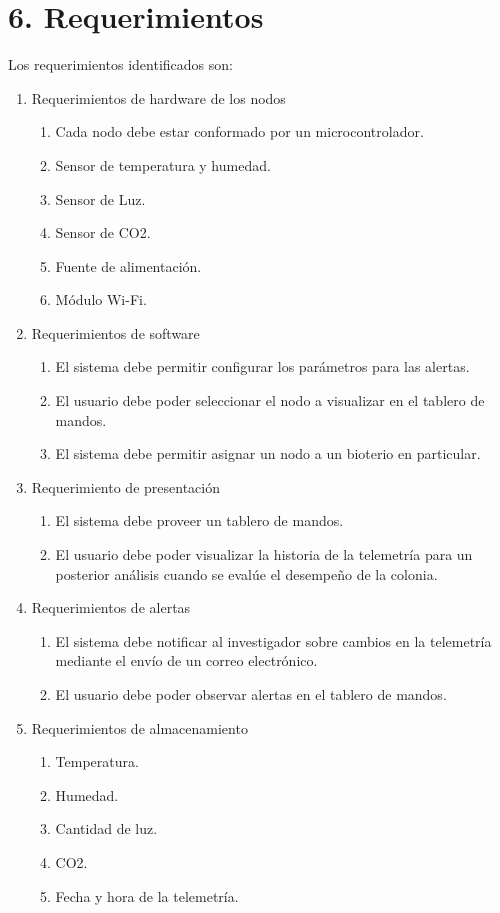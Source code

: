 \documentclass[
11pt, %
]{charter}
\begin{document}
\section{6. Requerimientos}
\label{sec:requerimientos}

Los requerimientos identificados son:
\begin{enumerate}
	\item Requerimientos de hardware de los nodos
		\begin{enumerate}
			\item Cada nodo debe estar conformado por un microcontrolador.
			\item Sensor de temperatura y humedad.
			\item Sensor de Luz.
			\item Sensor de CO2.
			\item Fuente de alimentación.
			\item Módulo Wi-Fi.
		\end{enumerate}
	\item Requerimientos de software
		\begin{enumerate}
			\item El sistema debe permitir configurar los parámetros para las alertas.
			\item El usuario debe poder seleccionar el nodo a visualizar en el tablero de mandos.
			\item El sistema debe permitir asignar un nodo a un bioterio en particular.
		\end{enumerate}
	\item Requerimiento de presentación
		\begin{enumerate}
			\item El sistema debe proveer un tablero de mandos.
			\item El usuario debe poder visualizar la historia de la telemetría para un posterior análisis cuando se evalúe el desempeño de la colonia.
		\end{enumerate}
	\item Requerimientos de alertas
		\begin{enumerate}
			\item El sistema debe notificar al investigador sobre cambios en la telemetría mediante el envío de un correo electrónico.
			\item El usuario debe poder observar alertas en el tablero de mandos.
		\end{enumerate}
	\item Requerimientos de almacenamiento
		\begin{enumerate}
			\item Temperatura.
			\item Humedad.
			\item Cantidad de luz.
			\item CO2.
			\item Fecha y hora de la telemetría.
		\end{enumerate}
\end{enumerate}
\end{document}
